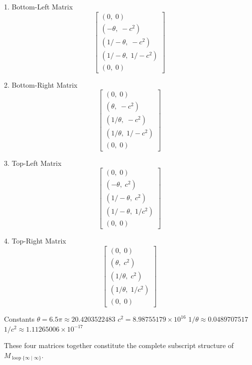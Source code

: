 1. Bottom-Left Matrix
\[
\begin{bmatrix}
(0,\; 0) \\
(-\theta,\; -c^2) \\
(1/-\theta,\; -c^2) \\
(1/-\theta,\; 1/-c^2) \\
(0,\; 0)
\end{bmatrix}
\]

2. Bottom-Right Matrix
\[
\begin{bmatrix}
(0,\; 0) \\
(\theta,\; -c^2) \\
(1/\theta,\; -c^2) \\
(1/\theta,\; 1/-c^2) \\
(0,\; 0)
\end{bmatrix}
\]

3. Top-Left Matrix
\[
\begin{bmatrix}
(0,\; 0) \\
(-\theta,\; c^2) \\
(1/-\theta,\; c^2) \\
(1/-\theta,\; 1/c^2) \\
(0,\; 0)
\end{bmatrix}
\]

4. Top-Right Matrix
\[
\begin{bmatrix}
(0,\; 0) \\
(\theta,\; c^2) \\
(1/\theta,\; c^2) \\
(1/\theta,\; 1/c^2) \\
(0,\; 0)
\end{bmatrix}
\]

Constants
\(\theta = 6.5\pi \approx 20.4203522483\)
\(c^2 = 8.98755179 \times 10^{16}\)
\(1/\theta \approx 0.0489707517\)
\(1/c^2 \approx 1.11265006 \times 10^{-17}\)

These four matrices together constitute the complete subscript structure of \(M_{\operatorname{loop}\{\infty\mid\infty\}}\).
